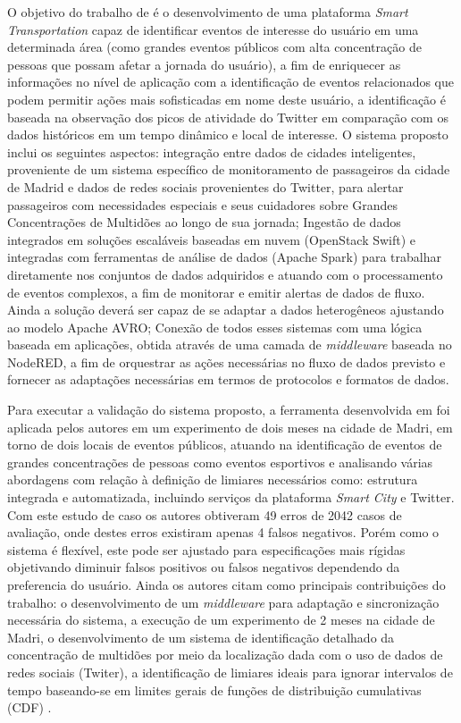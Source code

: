 \documentclass[ti,table]{texufpel} %
\begin{document}
	 O objetivo do trabalho de \cite{art9kousiouris2018integrated} é o desenvolvimento de uma plataforma \textit{Smart Transportation} capaz de identificar eventos de interesse do usuário em uma determinada área (como grandes eventos públicos com alta concentração de pessoas que possam afetar a jornada do usuário), a fim de enriquecer as informações no nível de aplicação com a identificação de eventos relacionados que podem permitir ações mais sofisticadas em nome deste usuário, a identificação é baseada na observação dos picos de atividade do Twitter em comparação com os dados históricos em um tempo dinâmico e local de interesse. O sistema proposto inclui os seguintes aspectos: integração entre dados de cidades inteligentes, proveniente de um sistema específico de monitoramento de passageiros da cidade de Madrid e dados de redes sociais provenientes do Twitter, para alertar passageiros com necessidades especiais e seus cuidadores sobre Grandes Concentrações de Multidões ao longo de sua jornada; Ingestão de dados integrados em soluções escaláveis baseadas em nuvem (OpenStack Swift) e integradas com ferramentas de análise de dados (Apache Spark) para trabalhar diretamente nos conjuntos de dados adquiridos e atuando com o processamento de eventos complexos, a fim de monitorar e emitir alertas de dados de fluxo. Ainda a solução deverá ser capaz de se adaptar a dados heterogêneos ajustando ao modelo Apache AVRO; Conexão de todos esses sistemas com uma lógica baseada em aplicações, obtida através de uma camada de \textit{middleware} baseada no NodeRED, a fim de orquestrar as ações necessárias no fluxo de dados previsto e fornecer as adaptações necessárias em termos de protocolos e formatos de dados.	
	
	 Para executar a validação do sistema proposto, a ferramenta desenvolvida em \cite{art9kousiouris2018integrated} foi aplicada pelos autores em um experimento de dois meses na cidade de Madri, em torno de dois locais de eventos públicos, atuando na identificação de eventos de grandes concentrações de pessoas como eventos esportivos e analisando várias abordagens com relação à definição de limiares necessários como: estrutura integrada e automatizada, incluindo serviços da plataforma \textit{Smart City} e Twitter. Com este estudo de caso os autores obtiveram 49 erros de 2042 casos de avaliação, onde destes erros existiram apenas 4 falsos negativos. Porém como o sistema é flexível, este pode ser ajustado para especificações mais rígidas objetivando diminuir falsos positivos ou falsos negativos dependendo da preferencia do usuário.
	Ainda os autores citam como principais contribuições do trabalho: o desenvolvimento de um \textit{middleware} para adaptação e sincronização necessária do sistema, a execução de um experimento de 2 meses na cidade de Madri, o desenvolvimento de um sistema de identificação detalhado da concentração  de multidões por meio da localização dada com o uso de dados de redes sociais (Twiter), a identificação de limiares ideais para ignorar intervalos de tempo baseando-se em limites gerais de funções de distribuição cumulativas (CDF) \cite{art9kousiouris2018integrated}.
\end{document}
